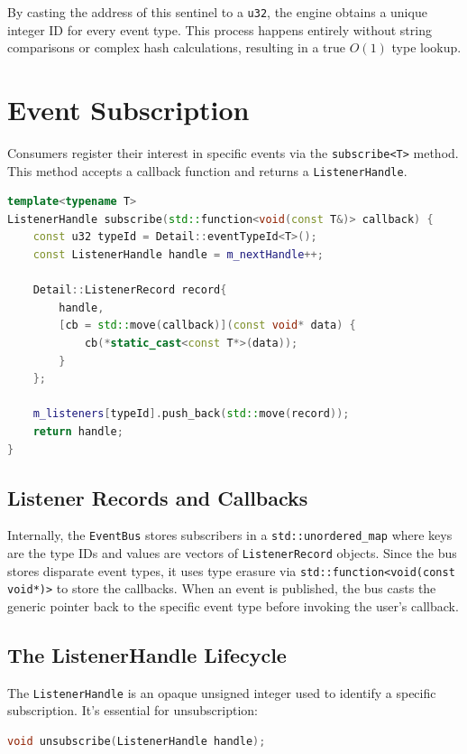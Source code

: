 By casting the address of this sentinel to a \texttt{u32}, the engine obtains a unique integer ID for every event type. This process happens entirely without string comparisons or complex hash calculations, resulting in a true $O(1)$ type lookup.

\section{Event Subscription}

Consumers register their interest in specific events via the \texttt{subscribe<T>} method. This method accepts a callback function and returns a \texttt{ListenerHandle}.

\begin{lstlisting}[language=C++]
template<typename T>
ListenerHandle subscribe(std::function<void(const T&)> callback) {
    const u32 typeId = Detail::eventTypeId<T>();
    const ListenerHandle handle = m_nextHandle++;

    Detail::ListenerRecord record{
        handle,
        [cb = std::move(callback)](const void* data) {
            cb(*static_cast<const T*>(data));
        }
    };

    m_listeners[typeId].push_back(std::move(record));
    return handle;
}
\end{lstlisting}

\subsection{Listener Records and Callbacks}
Internally, the \texttt{EventBus} stores subscribers in a \texttt{std::unordered\_map} where keys are the type IDs and values are vectors of \texttt{ListenerRecord} objects. Since the bus stores disparate event types, it uses type erasure via \texttt{std::function<void(const void*)>} to store the callbacks. When an event is published, the bus casts the generic pointer back to the specific event type before invoking the user's callback.

\subsection{The ListenerHandle Lifecycle}
The \texttt{ListenerHandle} is an opaque unsigned integer used to identify a specific subscription. It's essential for unsubscription:

\begin{lstlisting}[language=C++]
void unsubscribe(ListenerHandle handle);
\end{lstlisting}


